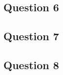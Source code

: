 \documentclass{article}
\begin{document}

\subsection*{Question 6}




\subsection*{Question 7}



\subsection*{Question 8}


\end{document}
